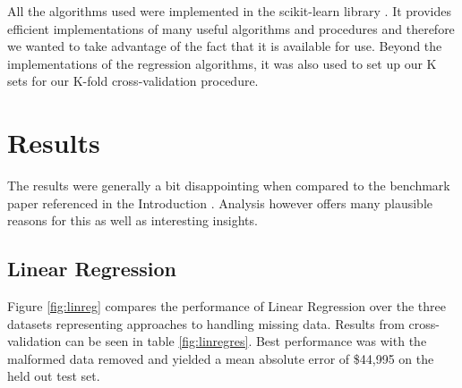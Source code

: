 \documentclass{acm_proc_article-sp}
\begin{document}
	All the algorithms used were implemented in the scikit-learn library \cite{scikit}. It provides efficient implementations of many useful algorithms and procedures and therefore we wanted to take advantage of the fact that it is available for use. Beyond the implementations of the regression algorithms, it was also used to set up our K sets for our K-fold cross-validation procedure. 

\section{Results}
	 The results were generally a bit disappointing when compared to the benchmark paper referenced in the Introduction \cite{bostonres}. Analysis however offers many plausible reasons for this as well as interesting insights. 
	 
\subsection{Linear Regression}
	Figure \ref{fig:linreg} compares the performance of Linear Regression over the three datasets representing approaches to handling missing data. Results from cross-validation can be seen in table  \ref{fig:linregres}. Best performance was with the malformed data removed and yielded a mean absolute error of \$44,995 on the held out test set.
\end{document}
